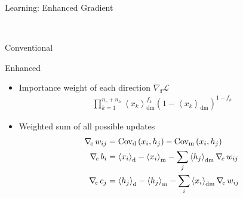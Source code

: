 \documentclass{beamer}
\newcommand{\qexp}[1]{\left<#1\right>}
\newcommand{\vect}[1]{\mathbf{#1}}
\newcommand{\cov}[0]{\operatorname{Cov}}
\newcommand{\vf}[0]{\vect{f}}
\newcommand{\td}[0]{\text{d}}
\newcommand{\tf}[0]{\text{m}}
\newcommand{\tdf}[0]{\text{dm}}
\newcommand{\LL}[0]{\mathcal{L}}
\newcommand{\enhnabla}[0]{\nabla_{\hspace{-0.5mm}e}\,}
\begin{document}
\begin{frame}{Learning: Enhanced Gradient}
\begin{minipage}{0.35\textwidth}
\begin{minipage}{0.49\columnwidth}
\begin{minipage}{\columnwidth}
\begin{center}
                \end{center}
            \end{minipage}
        \end{minipage}
        \\
        \begin{minipage}{0.49\columnwidth}
            \scriptsize
            \begin{center}
                Conventional
            \end{center}
        \end{minipage}
        \hfill
        \begin{minipage}{0.49\columnwidth}
            \scriptsize
            \begin{center}
                Enhanced
            \end{center}
        \end{minipage}
    \end{minipage}
    \hfill
    \begin{minipage}{0.64\textwidth}
        \small 
        \begin{itemize}
            \item Importance weight of each direction $\nabla_{\vf} \LL$
                \begin{align*}
                    \prod_{k=1}^{n_v+n_h} \qexp{x_k}_\tdf^{f_k}
                    \left( 1 - \qexp{x_k}_\tdf
                    \right)^{1-f_k} 
                \end{align*}

            \item Weighted sum of all possible updates 
            \begin{align*}
                \enhnabla w_{ij} &= \cov_\td\left(x_i, h_j\right)
                - \cov_\tf\left(x_i, h_j\right)
                \\
                \enhnabla b_i &= \left<x_i\right>_\td - \left<x_i\right>_\tf
                - \sum_j \qexp{ h_j }_\tdf
                \enhnabla w_{ij}
                \\
                \enhnabla c_j &= \left<h_j\right>_\td - \left<h_j\right>_\tf
                - \sum_i \qexp{ x_i }_\tdf
                \enhnabla w_{ij}
            \end{align*}
        \end{itemize}
    \end{minipage}
\end{frame}
\end{document}
